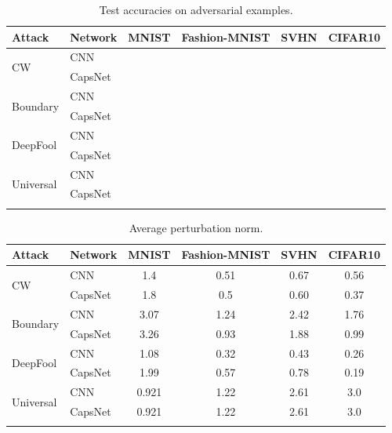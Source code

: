 \documentclass{article}
\begin{document}
\begin{table}[h]
	\centering
	\begin{tabular}{llcccc}
		\toprule
		Attack & Network       & MNIST & Fashion-MNIST & SVHN & CIFAR10  \\
		\midrule
		\multirow{2}{*}{CW} & CNN &  &  &  &  \\
		& CapsNet            &  &  &  &  \\
		\midrule
		\multirow{2}{*}{Boundary} & CNN &  &  &  &  \\
		& CapsNet            &  &  &  &  \\
		\midrule
		\multirow{2}{*}{DeepFool} & CNN &  &  &  &  \\
		& CapsNet           &  &  &  &  \\
		\midrule
		\multirow{2}{*}{Universal} & CNN &  &  &  &  \\
		& CapsNet           &  &  &  &  \\
		\bottomrule\\
	\end{tabular}
	\label{tab:attacks}
	\caption{Test accuracies on adversarial examples.}
\end{table}

\begin{table}[h]
	\centering
	\begin{tabular}{llcccc}
		\toprule
		Attack & Network       & MNIST & Fashion-MNIST & SVHN & CIFAR10  \\
		\midrule
		\multirow{2}{*}{CW} & CNN & 1.4 & 0.51 & 0.67 & 0.56 \\
		& CapsNet            & 1.8 & 0.5 & 0.60 & 0.37 \\
		\midrule
		\multirow{2}{*}{Boundary} & CNN & 3.07 & 1.24 & 2.42 & 1.76 \\
		& CapsNet            & 3.26 & 0.93 & 1.88 & 0.99 \\
		\midrule
		\multirow{2}{*}{DeepFool} & CNN & 1.08 & 0.32 & 0.43 & 0.26 \\
		& CapsNet           & 1.99 & 0.57 & 0.78 & 0.19 \\
		\midrule
		\multirow{2}{*}{Universal} & CNN & 0.921 & 1.22 & 2.61 & 3.0 \\
		& CapsNet           & 0.921 & 1.22 & 2.61 & 3.0 \\
		\bottomrule\\
	\end{tabular}
	\label{tab:norms}
	\caption{Average perturbation norm.}
\end{table}
\end{document}
